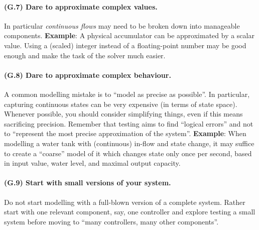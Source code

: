 \paragraph{(G.7) Dare to approximate complex values.}
In particular {\em continuous flows} may need to be broken down into manageable
components.
{\bf Example}: A physical accumulator can be approximated by a scalar value. 
Using a (scaled) integer instead of a floating-point number may be good enough and make the
task of the solver much easier.
%
\paragraph{(G.8) Dare to approximate complex behaviour.}
A common modelling mistake is to ``model as precise as possible''. 
In particular, capturing continuous states can be very expensive (in terms of
state space).  Whenever possible, you should consider simplifying things, even if this
means sacrificing precision. Remember that testing aims to find ``logical
errors'' and not to ``represent the most precise approximation of the system''.
{\bf Example}: When modelling a water tank with (continuous) in-flow and state
change, it may suffice to create a ``coarse'' model of it which changes state
only once per second, based in input value, water level, and maximal output
capacity. 
%
\paragraph{(G.9) Start with small versions of your system.}
Do not start modelling with a full-blown version of a complete system. Rather
start with one relevant component, say, one controller and explore testing a
small system
before moving to ``many controllers, many other components''.
